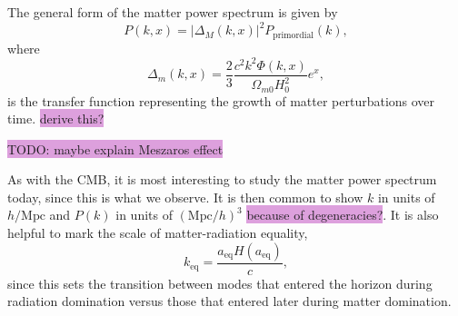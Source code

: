 \documentclass{aa}
\numberwithin{equation}{section}
\numberwithin{table}{section}
\numberwithin{figure}{section}
\begin{document}
The general form of the matter power spectrum is given by
\begin{equation}
  P(k, x) = |\Delta_M(k, x)|^2 P_\text{primordial}(k),
  \end{equation}
where
\begin{equation}
  \Delta_m(k, x) = \frac{2}{3}\frac{c^2 k^2 \Phi(k,x)}{\Omega_{m0}H_0^2}e^x,
\end{equation}
is the transfer function representing the growth of matter perturbations over time. \colorbox{Plum}{derive this?} 

\colorbox{Plum}{TODO: maybe explain Meszaros effect}

As with the CMB, it is most interesting to study the matter power spectrum today, since this is what we observe. It is then common to show $k$ in units of $h/\text{Mpc}$ and $P(k)$ in units of $(\text{Mpc}/h)^3$ \colorbox{Plum}{because of degeneracies?}. It is also helpful to mark the scale of matter-radiation equality,
\begin{equation}
k_\text{eq} = \frac{a_\text{eq} H(a_\text{eq})}{c},
\end{equation}
since this sets the transition between modes that entered the horizon during radiation domination versus those that entered later during matter domination. 
\end{document}
